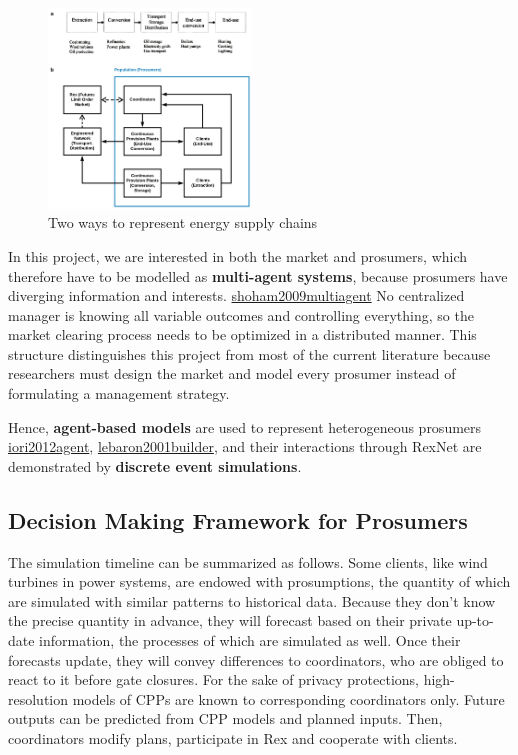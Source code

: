 \documentclass[letterpaper,8pt,twocolumn,twoside,]{pinp}
\begin{document}
\begin{figure}
\centering
\includegraphics[width=0.48\textwidth]{../../../images/1-3.png} 
\caption{Two ways to represent energy supply chains}
\label{1}
\end{figure}

In this project, we are interested in both the market and prosumers,
which therefore have to be modelled as \textbf{multi-agent systems},
because prosumers have diverging information and interests.
\protect\hyperlink{reference}{shoham2009multiagent} No centralized
manager is knowing all variable outcomes and controlling everything, so
the market clearing process needs to be optimized in a distributed
manner. This structure distinguishes this project from most of the
current literature because researchers must design the market and model
every prosumer instead of formulating a management strategy.

Hence, \textbf{agent-based models} are used to represent heterogeneous
prosumers \protect\hyperlink{reference}{iori2012agent},
\protect\hyperlink{reference}{lebaron2001builder}, and their
interactions through RexNet are demonstrated by \textbf{discrete event
simulations}.

\hypertarget{decision-making-framework-for-prosumers}{%
\subsection{Decision Making Framework for
Prosumers}\label{decision-making-framework-for-prosumers}}

The simulation timeline can be summarized as follows. Some clients, like
wind turbines in power systems, are endowed with prosumptions, the
quantity of which are simulated with similar patterns to historical
data. Because they don't know the precise quantity in advance, they will
forecast based on their private up-to-date information, the processes of
which are simulated as well. Once their forecasts update, they will
convey differences to coordinators, who are obliged to react to it
before gate closures. For the sake of privacy protections,
high-resolution models of CPPs are known to corresponding coordinators
only. Future outputs can be predicted from CPP models and planned
inputs. Then, coordinators modify plans, participate in Rex and
cooperate with clients.
\end{document}
